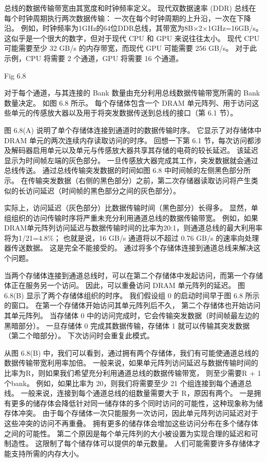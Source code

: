 总线的数据传输带宽由其宽度和时钟频率定义。 现代双数据速率 (DDR) 总线在每个时钟周期执行两次数据传输：
一次在每个时钟周期的上升沿，一次在下降沿。 例如，时钟频率为1GHz的64位DDR总线，其带宽为8B×2×1GHz=16GB/s。 
这似乎是一个很大的数字，但对于现代 CPU 和 GPU 来说往往太小。 
现代 CPU 可能需要至少 32 GB/s 的内存带宽，而现代 GPU 可能需要 256 GB/s。 
对于此示例，CPU 将需要 2 个通道，GPU 将需要 16 个通道。

{\color{red} Fig 6.8}

对于每个通道，与其连接的 Bank 数量由充分利用总线数据传输带宽所需的 Bank 数量决定。 如图 6.8 所示。 
每个存储体包含一个 DRAM 单元阵列、用于访问这些单元的传感放大器以及用于将突发数据传送到总线的接口（第 6.1 节）。

图 6.8(A) 说明了单个存储体连接到通道时的数据传输时序。 它显示了对存储体中 DRAM 单元的两次连续内存读取访问的时序。 
回想一下第 6.1 节，每次访问都涉及解码器启用单元以及单元与传感放大器共享其存储的电荷的较长延迟。 
该延迟显示为时间帧左端的灰色部分。 一旦传感放大器完成其工作，突发数据就会通过总线传送。 
通过总线传输突发数据的时间如图 6.8 中时间帧的左侧黑色部分所示。 
在传输突发数据（右侧的黑色部分）之前，第二次存储器读取访问将产生类似的长访问延迟（时间帧的黑色部分之间的灰色部分）。

实际上，访问延迟（灰色部分）比数据传输时间（黑色部分）长得多。 
显然，单组组织的访问传输时序将严重未充分利用通道总线的数据传输带宽。 
例如，如果DRAM单元阵列访问延迟与数据传输时间的比率为20:1，则通道总线的最大利用率将为1/21=4.8\%； 
也就是说，16 GB/s 通道将以不超过 0.76 GB/s 的速率向处理器传送数据。 
这是完全不能接受的。 通过将多个存储体连接到通道总线来解决这个问题。

当两个存储体连接到通道总线时，可以在第二个存储体中发起访问，而第一个存储体正在服务另一个访问。 
因此，可以重叠访问 DRAM 单元阵列的延迟。 图 6.8(B) 显示了两个存储体组织的时序。 
我们假设组 0 的启动时间早于图 6.8 所示的窗口。 在第一个存储体开始访问其单元阵列后不久，
第二个存储体也开始访问其单元阵列。 当存储体 0 中的访问完成时，它会传输突发数据（时间帧最左边的黑暗部分）。 
一旦存储体 0 完成其数据传输，存储体 1 就可以传输其突发数据（第二个暗部分）。 下次访问时会重复此模式。

从图 6.8(B) 中，我们可以看到，通过拥有两个存储体，我们有可能使通道总线的数据传输带宽利用率加倍。 
一般来说，如果单元阵列访问延迟与数据传输时间的比率为R，则如果我们希望充分利用通道总线的数据传输带宽，
则至少需要R + 1个bank。 例如，如果比率为 20，则我们将需要至少 21 个组连接到每个通道总线。 
一般来说，连接到每个通道总线的组数量需要大于 R，原因有两个。 
一是拥有更多的储存体会降低针对同一储存体的多个同时访问的可能性，这种现象称为储存体冲突。 
由于每个存储体一次只能服务一次访问，因此单元阵列访问延迟对于这些冲突的访问不再重叠。 
拥有更多的储存体会增加这些访问分布在多个储存体之间的可能性。 
第二个原因是每个单元阵列的大小被设置为实现合理的延迟和可制造性。 这限制了每个储存体可以提供的单元数量。 
人们可能需要许多存储体才能支持所需的内存大小。

